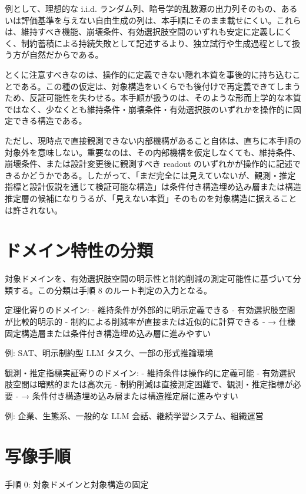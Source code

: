 \documentclass[12pt,a4paper]{article}
\begin{document}
例として、理想的な i.i.d. ランダム列、暗号学的乱数源の出力列そのもの、あるいは評価基準を与えない自由生成の列は、本手順にそのまま載せにくい。これらは、維持すべき機能、崩壊条件、有効選択肢空間のいずれも安定に定義しにくく、制約蓄積による持続失敗として記述するより、独立試行や生成過程として扱う方が自然だからである。

とくに注意すべきなのは、操作的に定義できない隠れ本質を事後的に持ち込むことである。この種の仮定は、対象構造をいくらでも後付けで再定義できてしまうため、反証可能性を失わせる。本手順が扱うのは、そのような形而上学的な本質ではなく、少なくとも維持条件・崩壊条件・有効選択肢のいずれかを操作的に固定できる構造である。

ただし、現時点で直接観測できない内部機構があること自体は、直ちに本手順の対象外を意味しない。重要なのは、その内部機構を仮定しなくても、維持条件、崩壊条件、または設計変更後に観測すべき readout のいずれかが操作的に記述できるかどうかである。したがって、「まだ完全には見えていないが、観測・推定指標と設計仮説を通じて検証可能な構造」は条件付き構造埋め込み層または構造推定層の候補になりうるが、「見えない本質」そのものを対象構造に据えることは許されない。

\section{ドメイン特性の分類}\label{ux30c9ux30e1ux30a4ux30f3ux7279ux6027ux306eux5206ux985e}

対象ドメインを、有効選択肢空間の明示性と制約削減の測定可能性に基づいて分類する。この分類は手順 8 のルート判定の入力となる。

定理化寄りのドメイン: - 維持条件が外部的に明示定義できる - 有効選択肢空間が比較的明示的 - 制約による削減率が直接または近似的に計算できる - → 仕様固定構造層または条件付き構造埋め込み層に進みやすい

例: SAT、明示制約型 LLM タスク、一部の形式推論環境

観測・推定指標実証寄りのドメイン: - 維持条件は操作的に定義可能 - 有効選択肢空間は暗黙的または高次元 - 制約削減は直接測定困難で、観測・推定指標が必要 - → 条件付き構造埋め込み層または構造推定層に進みやすい

例: 企業、生態系、一般的な LLM 会話、継続学習システム、組織運営

\section{写像手順}\label{ux5199ux50cfux624bux9806}

手順 0: 対象ドメインと対象構造の固定
\end{document}
